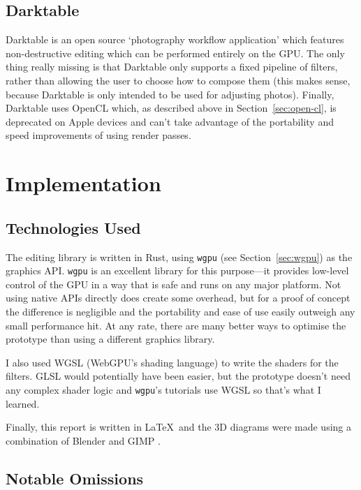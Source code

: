 \documentclass[12pt]{article}
\begin{document}
\subsection{Darktable}

Darktable \cite{darktable} is an open source `photography workflow application'
which features non-destructive editing which can be performed entirely on the GPU.  The only thing
really missing is that Darktable only supports a fixed pipeline of filters, rather than allowing the
user to choose how to compose them (this makes sense, because Darktable is only intended to be used
for adjusting photos).  Finally, Darktable uses OpenCL which, as described above in
Section~\ref{sec:open-cl}, is deprecated on Apple devices and can't take advantage of the
portability and speed improvements of using render passes.



\pagebreak

\section{Implementation}\label{sec:implementation}

\subsection{Technologies Used}

The editing library is written in Rust, using \verb|wgpu| (see Section~\ref{sec:wgpu}) as the
graphics API\@.  \verb|wgpu| is an excellent library for this purpose---it provides low-level
control of the GPU in a way that is safe and runs on any major platform.  Not using native APIs
directly does create some overhead, but for a proof of concept the difference is negligible and the
portability and ease of use easily outweigh any small performance hit.  At any rate, there are many
better ways to optimise the prototype than using a different graphics library.

I also used WGSL (WebGPU's shading language) to write the shaders for the filters.  GLSL would
potentially have been easier, but the prototype doesn't need any complex shader logic and
\verb|wgpu|'s tutorials use WGSL so that's what I learned.

Finally, this report is written in \LaTeX\ and the 3D diagrams were made using a combination of
Blender \cite{blender} and GIMP \cite{gimp}.

\subsection{Notable Omissions}\label{sec:omissions}
\end{document}
